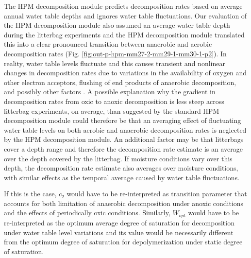 \documentclass[esd, manuscript]{copernicus}
\begin{document}
The HPM decomposition module predicts decomposition rates based on average annual water table depths \citep{Frolking.2010} and ignores water table fluctuations. Our evaluation of the HPM decomposition module also assumed an average water table depth during the litterbag experiments and the HPM decomposition module translated this into a clear pronounced transition between anaerobic and aerobic decomposition rates (Fig. \ref{fig:out-p-hpm-mm27-2-mm29-1-mm30-1-p2}). In reality, water table levels fluctuate and this causes transient and nonlinear changes in decomposition rates due to variations in the availability of oxygen and other electron acceptors, flushing of end products of anaerobic decomposition, and possibly other factors \citep{Siegel.1995, Blodau.2003, Blodau.2004, Beer.2007, Knorr.2009, Walpen.2018, Campeau.2021, Kim.2021, Treat.2022, Obradovic.2023}. A possible explanation why the gradient in decomposition rates from oxic to anoxic decomposition is less steep across litterbag experiments, on average, than suggested by the standard HPM decomposition module could therefore be that an averaging effect of fluctuating water table levels on both aerobic and anaerobic decomposition rates is neglected by the HPM decomposition module. An additional factor may be that litterbags cover a depth range and therefore the decomposition rate estimate is an average over the depth covered by the litterbag. If moisture conditions vary over this depth, the decomposition rate estimate also averages over moisture conditions, with similar effects as the temporal average caused by water table fluctuations.

If this is the case, \(c_2\) would have to be re-interpreted as transition parameter that accounts for both limitation of anaerobic decomposition under anoxic conditions and the effects of periodically oxic conditions. Similarly, \(W_{opt}\) would have to be re-interpreted as the optimum average degree of saturation for decomposition under water table level variations and its value would be necessarily different from the optimum degree of saturation for depolymerization under static degree of saturation.
\end{document}

